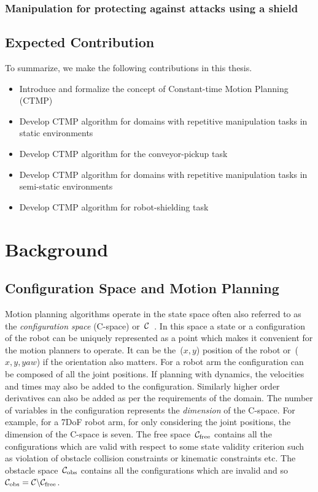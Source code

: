 \documentclass[a4paper]{report}
\begin{document}
\subsection{Manipulation for protecting against attacks using a shield}

\section{Expected Contribution}
To summarize, we make the following contributions in this thesis.
\begin{itemize}
	\item Introduce and formalize the concept of Constant-time Motion Planning (CTMP)
	\item Develop CTMP algorithm for domains with repetitive manipulation tasks in static environments
	\item Develop CTMP algorithm for the conveyor-pickup task
	\item Develop CTMP algorithm for domains with repetitive manipulation tasks in semi-static environments
	\item Develop CTMP algorithm for robot-shielding task
\end{itemize}

\newpage
\chapter{Background}
\section{Configuration Space and Motion Planning}
Motion planning algorithms operate in the state space often also referred to as the \emph{configuration space} (C-space) or~$\mathcal{C}$~\cite{lozano1990spatial}. In this space a state or a configuration of the robot can be uniquely represented as a point which makes it convenient for the motion planners to operate. It can be the~($x,y$) position of the robot or~($x,y,yaw$) if the orientation also matters. For a robot arm the configuration can be composed of all the joint positions. If planning with dynamics, the velocities and times may also be added to the configuration. Similarly higher order derivatives can also be added as per the requirements of the domain. The number of variables in the configuration represents the \emph{dimension} of the C-space. For example, for a 7DoF robot arm, for only considering the joint positions, the dimension of the C-space is seven. The free space~$\mathcal{C}_{\rm free}$ contains all the configurations which are valid with respect to some state validity criterion such as violation of obstacle collision constraints or kinematic constraints etc. The obstacle space~$\mathcal{C}_{\rm obs}$ contains all the configurations which are invalid and so~$\mathcal{C}_{\rm obs} = \mathcal{C} \backslash \mathcal{C}_{\rm free}$.
\end{document}
